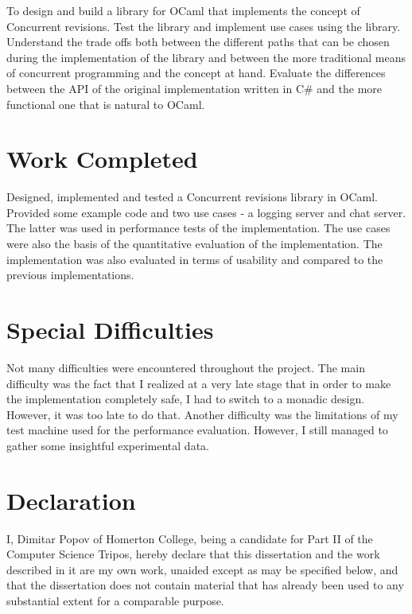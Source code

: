 \documentclass[12pt,twoside,notitlepage]{report}
\begin{document}
To design and build a library for OCaml that implements the concept of Concurrent revisions. Test the library and implement use cases using the library. Understand the trade offs both between the different paths that can be chosen during the implementation of the library and between the more traditional means of concurrent programming and the concept at hand. Evaluate the differences between the API of the original implementation written in C\#\cite{conrev} and the more functional one that is natural to OCaml. 


\section*{Work Completed}

Designed, implemented and tested a Concurrent revisions library in OCaml. Provided some example code and two use cases - a logging server and chat server. The latter was used in performance tests of the implementation.
The use cases were also the basis of the quantitative evaluation of the implementation. The implementation was also evaluated in terms of usability and compared to the previous implementations.

\section*{Special Difficulties}

Not many difficulties were encountered throughout the project. The main difficulty was the fact that I realized at a very late stage that in order to make the implementation completely safe, I had to switch to a monadic design. However, it was too late to do that. Another difficulty was the limitations of my test machine used for the performance evaluation. However, I still managed to gather some insightful experimental data. 


 
\newpage
\section*{Declaration}

I, Dimitar Popov of Homerton College, being a candidate for Part II of the Computer
Science Tripos, hereby declare
that this dissertation and the work described in it are my own work,
unaided except as may be specified below, and that the dissertation
does not contain material that has already been used to any substantial
extent for a comparable purpose.
\end{document}
